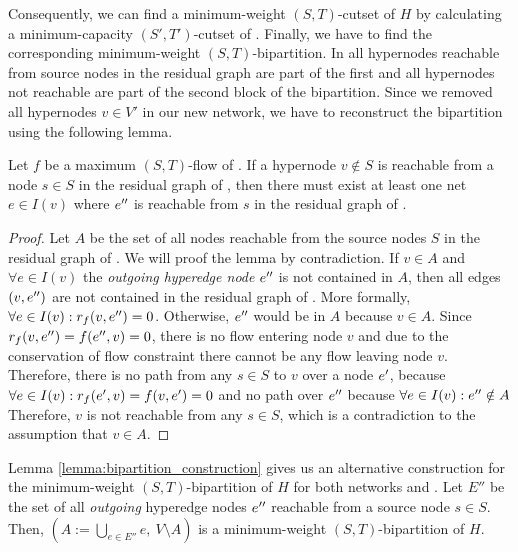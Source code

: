 Consequently, we can find a minimum-weight $(S,T)$-cutset of $H$ by calculating
a minimum-capacity $(S',T')$-cutset of . Finally, we have to find the 
corresponding minimum-weight $(S,T)$-bipartition. In  all hypernodes
reachable from source nodes in the residual graph are part of the first and 
all hypernodes not reachable are part of the second block of the bipartition. Since we removed 
all hypernodes $v \in V'$ in our new network, we have to reconstruct the bipartition
using the following lemma.

\begin{lemma}
\label{lemma:bipartition_construction}
Let $f$ be a maximum $(S,T)$-flow of . If a hypernode $v \notin S$ is reachable
from a node $s \in S$ in the residual graph of , then there must exist at least one
net $e \in I(v)$ where $e''$ is reachable from $s$ in the residual graph of .
\end{lemma}

\begin{proof}
Let $A$ be the set of all nodes reachable from the source nodes $S$ in the residual graph of .
We will proof the lemma by contradiction.
If $v \in A$ and $\forall e \in I(v)$ the \emph{outgoing hyperedge node} $e''$
is not contained in $A$, then all edges $(v,e'')$ are not contained in
the residual graph of . More formally, $\forall e \in I(v): r_f(v,e'') = 0$. 
Otherwise, $e''$ would be in $A$ because $v \in A$. 
Since $r_f(v,e'') = f(e'',v) = 0$, there is no flow entering node 
$v$ and due to the conservation of flow constraint there cannot be any 
flow leaving node $v$. Therefore, there is no path
from any $s \in S$ to $v$ over a node $e'$, because $\forall e \in I(v): r_f(e',v) = f(v,e') = 0$ and no path over $e''$ because $\forall e \in I(v): e'' \notin A$
Therefore, $v$ is not reachable from any $s \in S$, which is a contradiction
to the assumption that $v \in A$.
\end{proof}

Lemma \ref{lemma:bipartition_construction} gives us an alternative construction for the minimum-weight $(S,T)$-bipartition
of $H$ for both networks  and . Let $E''$ be the set of all
\emph{outgoing} hyperedge nodes $e''$ reachable from a source node $s \in S$.
Then, $(A := \bigcup_{e \in E''} e,\ V\setminus A)$ is a minimum-weight $(S,T)$-bipartition of $H$.


